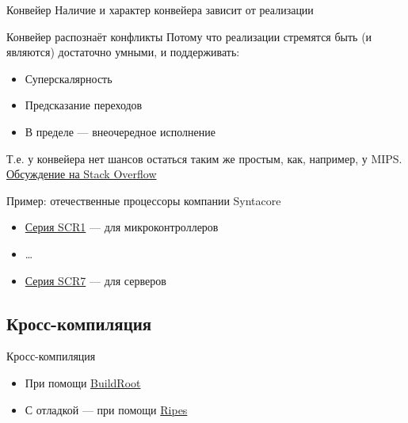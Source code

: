 \documentclass[xetex,aspectratio=43]{beamer}
\begin{document}
\begin{frame}{Конвейер}
    Наличие и характер конвейера зависит от реализации
    \pause
    \begin{block}{Конвейер распознаёт конфликты}
        Потому что реализации стремятся быть (и являются) достаточно умными, и поддерживать:
        \begin{itemize}
            \tightlist
            \item Суперскалярность
            \item Предсказание переходов
            \item В пределе --- внеочередное исполнение
        \end{itemize}
    \end{block}
    \pause
    Т.е. у конвейера нет шансов остаться таким же простым, как, например, у MIPS.
    \href{https://stackoverflow.com/a/54725021}{Обсуждение на Stack Overflow}
    \pause
    \begin{block}{Пример: отечественные процессоры компании Syntacore}
        \begin{itemize}
            \tightlist
            \item \href{https://syntacore.ru/page/products/processor-ip/scr1}{Серия SCR1} --- для микроконтроллеров
            \item \ldots
            \item \href{https://syntacore.ru/page/products/processor-ip/scr7}{Серия SCR7} --- для серверов
        \end{itemize}
    \end{block}
\end{frame}

\subsection{Кросс-компиляция}

\begin{frame}{Кросс-компиляция}
    \begin{itemize}
        \item При помощи \href{https://buildroot.org/}{BuildRoot}
        \item С отладкой — при помощи \href{http://ripes.me/Ripes/}{Ripes} %
    \end{itemize}
\end{frame}

\end{document}
